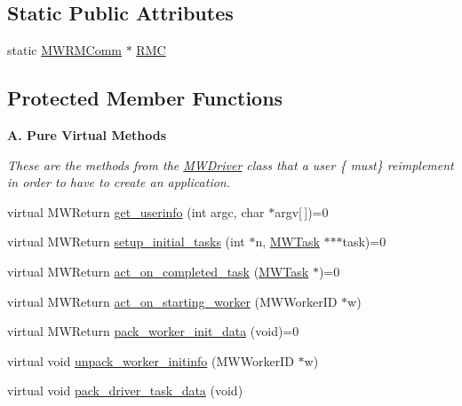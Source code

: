 \subsection*{Static Public Attributes}
\begin{DoxyCompactItemize}
\item 
static \hyperlink{classMWRMComm}{M\+W\+R\+M\+Comm} $\ast$ \hyperlink{classMWDriver_a3063439d04c8048868d6c4d5c51c6778}{R\+MC}
\end{DoxyCompactItemize}
\subsection*{Protected Member Functions}
\begin{Indent}\textbf{ A. Pure Virtual Methods}\par
{\em These are the methods from the \hyperlink{classMWDriver}{M\+W\+Driver} class that a user \{ must\} reimplement in order to have to create an application. }\begin{DoxyCompactItemize}
\item 
virtual M\+W\+Return \hyperlink{classMWDriver_acf0edc86b06b46968114c8bb770791b2}{get\+\_\+userinfo} (int argc, char $\ast$argv\mbox{[}$\,$\mbox{]})=0
\item 
virtual M\+W\+Return \hyperlink{classMWDriver_a618bdbf6e481a903455e068ba37ba0fa}{setup\+\_\+initial\+\_\+tasks} (int $\ast$n, \hyperlink{classMWTask}{M\+W\+Task} $\ast$$\ast$$\ast$task)=0
\item 
virtual M\+W\+Return \hyperlink{classMWDriver_a920118e3f49ab81db5047d9ecdbcea2b}{act\+\_\+on\+\_\+completed\+\_\+task} (\hyperlink{classMWTask}{M\+W\+Task} $\ast$)=0
\item 
virtual M\+W\+Return \hyperlink{classMWDriver_a8199945d5f7c89bde67962da6d0c7ffe}{act\+\_\+on\+\_\+starting\+\_\+worker} (M\+W\+Worker\+ID $\ast$w)
\item 
virtual M\+W\+Return \hyperlink{classMWDriver_a6a142fda8b58806b1769558afd17c85c}{pack\+\_\+worker\+\_\+init\+\_\+data} (void)=0
\item 
virtual void \hyperlink{classMWDriver_aaddea2ee086b0683b5d80ecb0438df91}{unpack\+\_\+worker\+\_\+initinfo} (M\+W\+Worker\+ID $\ast$w)
\item 
virtual void \hyperlink{classMWDriver_af6856e6de5bd17575e809e8e24140844}{pack\+\_\+driver\+\_\+task\+\_\+data} (void)
\end{DoxyCompactItemize}
\end{Indent}
